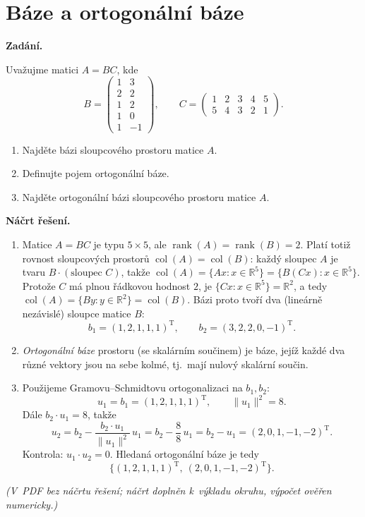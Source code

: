 \section{Báze a ortogonální báze}

\noindent\textbf{Zadání.}\par
Uvažujme matici $A = BC$, kde
\[
  B = \begin{pmatrix}
    1 & 3 \\
    2 & 2 \\
    1 & 2 \\
    1 & 0 \\
    1 & -1
  \end{pmatrix},
  \qquad
  C = \begin{pmatrix}
    1 & 2 & 3 & 4 & 5 \\
    5 & 4 & 3 & 2 & 1
  \end{pmatrix}.
\]
\begin{enumerate}
  \item Najděte bázi sloupcového prostoru matice $A$.
  \item Definujte pojem ortogonální báze.
  \item Najděte ortogonální bázi sloupcového prostoru matice $A$.
\end{enumerate}

\medskip
\noindent\textbf{Náčrt řešení.}\par
\begin{enumerate}
  \item Matice $A = BC$ je typu $5 \times 5$, ale $\operatorname{rank}(A) = \operatorname{rank}(B) = 2$. Platí totiž rovnost sloupcových prostorů $\operatorname{col}(A) = \operatorname{col}(B)$: každý sloupec $A$ je tvaru $B \cdot (\text{sloupec } C)$, takže $\operatorname{col}(A) = \{Ax : x \in \mathbb{R}^5\} = \{B(Cx) : x \in \mathbb{R}^5\}$. Protože $C$ má plnou řádkovou hodnost $2$, je $\{Cx : x \in \mathbb{R}^5\} = \mathbb{R}^2$, a tedy $\operatorname{col}(A) = \{By : y \in \mathbb{R}^2\} = \operatorname{col}(B)$. Bázi proto tvoří dva (lineárně nezávislé) sloupce matice $B$:
    \[
      b_1 = (1,2,1,1,1)^{\mathrm{T}}, \qquad b_2 = (3,2,2,0,-1)^{\mathrm{T}}.
    \]
  \item \emph{Ortogonální báze} prostoru (se skalárním součinem) je báze, jejíž každé dva různé vektory jsou na sebe kolmé, tj.\ mají nulový skalární součin.
  \item Použijeme Gramovu--Schmidtovu ortogonalizaci na $b_1, b_2$:
    \[
      u_1 = b_1 = (1,2,1,1,1)^{\mathrm{T}}, \qquad \|u_1\|^2 = 8.
    \]
    Dále $b_2 \cdot u_1 = 8$, takže
    \[
      u_2 = b_2 - \frac{b_2 \cdot u_1}{\|u_1\|^2}\, u_1 = b_2 - \frac{8}{8}\, u_1 = b_2 - u_1 = (2,0,1,-1,-2)^{\mathrm{T}}.
    \]
    Kontrola: $u_1 \cdot u_2 = 0$. Hledaná ortogonální báze je tedy
    \[
      \{(1,2,1,1,1)^{\mathrm{T}},\ (2,0,1,-1,-2)^{\mathrm{T}}\}.
    \]
\end{enumerate}

\medskip
\noindent\textit{(V~PDF bez náčrtu řešení; náčrt doplněn k~výkladu okruhu, výpočet ověřen numericky.)}
